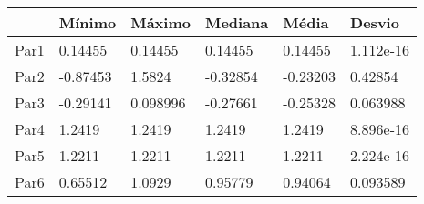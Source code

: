 \begin{tabular}{llllll}
& Mínimo & Máximo & Mediana & Média & Desvio \\ 
\hline 
Par1 & 0.14455 & 0.14455 & 0.14455 & 0.14455 & 1.112e-16 \\ 
Par2 & -0.87453 & 1.5824 & -0.32854 & -0.23203 & 0.42854 \\ 
Par3 & -0.29141 & 0.098996 & -0.27661 & -0.25328 & 0.063988 \\ 
Par4 & 1.2419 & 1.2419 & 1.2419 & 1.2419 & 8.896e-16 \\ 
Par5 & 1.2211 & 1.2211 & 1.2211 & 1.2211 & 2.224e-16 \\ 
Par6 & 0.65512 & 1.0929 & 0.95779 & 0.94064 & 0.093589 \\ 
\hline 
\end{tabular}